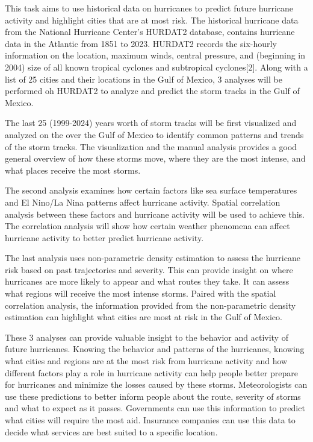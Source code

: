 \documentclass[12pt,letterpaper]{article}
\begin{document}
This task aims to use historical data on hurricanes to predict future
hurricane activity and highlight cities that are at most risk. The
historical hurricane data from the National Hurricane Center's HURDAT2
database, contains hurricane data in the Atlantic from 1851 to 2023.
HURDAT2 records the six-hourly information on the location, maximum
winds, central pressure, and (beginning in 2004) size of all known
tropical cyclones and subtropical cyclones{[}2{]}. Along with a list of
25 cities and their locations in the Gulf of Mexico, 3 analyses will be
performed oh HURDAT2 to analyze and predict the storm tracks in the Gulf
of Mexico.

The last 25 (1999-2024) years worth of storm tracks will be first
visualized and analyzed on the over the Gulf of Mexico to identify
common patterns and trends of the storm tracks. The visualization and
the manual analysis provides a good general overview of how these storms
move, where they are the most intense, and what places receive the most
storms.

The second analysis examines how certain factors like sea surface
temperatures and El Nino/La Nina patterns affect hurricane activity.
Spatial correlation analysis between these factors and hurricane
activity will be used to achieve this. The correlation analysis will
show how certain weather phenomena can affect hurricane activity to
better predict hurricane activity.

The last analysis uses non-parametric density estimation to assess the
hurricane risk based on past trajectories and severity. This can provide
insight on where hurricanes are more likely to appear and what routes
they take. It can assess what regions will receive the most intense
storms. Paired with the spatial correlation analysis, the information
provided from the non-parametric density estimation can highlight what
cities are most at risk in the Gulf of Mexico.

These 3 analyses can provide valuable insight to the behavior and
activity of future hurricanes. Knowing the behavior and patterns of the
hurricanes, knowing what cities and regions are at the most risk from
hurricane activity and how different factors play a role in hurricane
activity can help people better prepare for hurricanes and minimize the
losses caused by these storms. Meteorologists can use these predictions
to better inform people about the route, severity of storms and what to
expect as it passes. Governments can use this information to predict
what cities will require the most aid. Insurance companies can use this
data to decide what services are best suited to a specific location.
\end{document}

